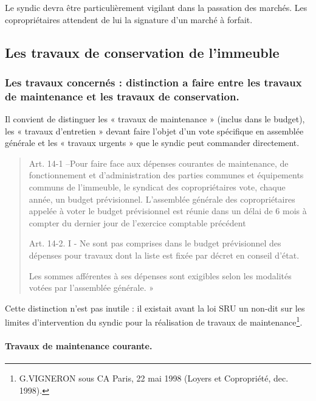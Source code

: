 			Le syndic devra être particulièrement vigilant dans la passation des marchés. Les copropriétaires attendent de lui la signature d'un marché à forfait.
	
	\subsection{Les travaux de conservation de l’immeuble}
	
		\subsubsection{Les travaux concernés : distinction a faire entre les travaux de maintenance et les travaux de conservation.}

			Il convient de distinguer les « travaux de maintenance » (inclus dans le budget), les « travaux d’entretien » devant faire l’objet d’un vote spécifique en assemblée générale et les « travaux urgents » que le syndic peut commander directement.
			
			\begin{quote}
				Art. 14-1 –Pour faire face aux dépenses courantes de maintenance, de fonctionnement et d'administration des parties communes et équipements communs de l'immeuble, le syndicat des copropriétaires vote, chaque année, un budget prévisionnel. L'assemblée générale des copropriétaires appelée à voter le budget prévisionnel est réunie dans un délai de 6 mois à compter du dernier jour de l'exercice comptable précédent
				
				Art. 14-2. I - Ne sont pas comprises dans le budget prévisionnel des dépenses pour travaux dont la liste est fixée par décret en conseil d'état.
				
				Les sommes afférentes à ses dépenses sont exigibles selon les modalités votées par l'assemblée générale. »
			\end{quote}
			
			Cette distinction n’est pas inutile : il existait avant la loi SRU un non-dit sur les limites d’intervention du syndic pour la réalisation de travaux de maintenance\footnote{G.VIGNERON sous CA Paris, 22 mai 1998 (Loyers et Copropriété, dec. 1998).}.
			
			\paragraph{Travaux de maintenance courante.}
			
